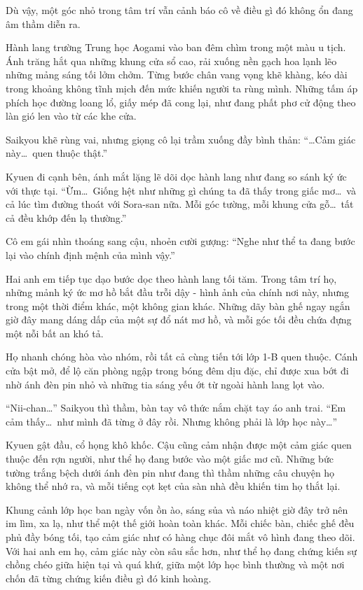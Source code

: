 \documentclass[../main.tex]{subfiles}
\begin{document}
Dù vậy, một góc nhỏ trong tâm trí vẫn cảnh báo cô về điều gì đó không ổn đang âm thầm diễn ra.

\ct

Hành lang trường Trung học Aogami vào ban đêm chìm trong một màu u tịch. Ánh trăng hắt qua những khung cửa sổ cao, rải xuống nền gạch hoa lạnh lẽo những mảng sáng tối lởm chởm. Từng bước chân vang vọng khẽ khàng, kéo dài trong khoảng không tĩnh mịch đến mức khiến người ta rùng mình. Những tấm áp phích học đường loang lổ, giấy mép đã cong lại, như đang phất phơ cử động theo làn gió len vào từ các khe cửa.

Saikyou khẽ rùng vai, nhưng giọng cô lại trầm xuống đầy bình thản: ``\dots Cảm giác này\dots\ quen thuộc thật.''

Kyuen đi cạnh bên, ánh mắt lặng lẽ dõi dọc hành lang như đang so sánh ký ức với thực tại. ``Ừm\dots\ Giống hệt như những gì chúng ta đã thấy trong giấc mơ\dots\ và cả lúc tìm đường thoát với Sora-san nữa. Mỗi góc tường, mỗi khung cửa gỗ\dots\ tất cả đều khớp đến lạ thường.''

Cô em gái nhìn thoáng sang cậu, nhoẻn cười gượng: ``Nghe như thể ta đang bước lại vào chính định mệnh của mình vậy.''

Hai anh em tiếp tục dạo bước dọc theo hành lang tối tăm. Trong tâm trí họ, những mảnh ký ức mơ hồ bắt đầu trỗi dậy - hình ảnh của chính nơi này, nhưng trong một thời điểm khác, một không gian khác. Những dãy bàn ghế ngay ngắn giờ đây mang dáng dấp của một sự đổ nát mơ hồ, và mỗi góc tối đều chứa đựng một nỗi bất an khó tả.

Họ nhanh chóng hòa vào nhóm, rồi tất cả cùng tiến tới lớp 1-B quen thuộc. Cánh cửa bật mở, để lộ căn phòng ngập trong bóng đêm dịu đặc, chỉ được xua bớt đi nhờ ánh đèn pin nhỏ và những tia sáng yếu ớt từ ngoài hành lang lọt vào.

``Nii-chan\dots'' Saikyou thì thầm, bàn tay vô thức nắm chặt tay áo anh trai. ``Em cảm thấy\dots\ như mình đã từng ở đây rồi. Nhưng không phải là lớp học này\dots''

Kyuen gật đầu, cổ họng khô khốc. Cậu cũng cảm nhận được một cảm giác quen thuộc đến rợn người, như thể họ đang bước vào một giấc mơ cũ. Những bức tường trắng bệch dưới ánh đèn pin như đang thì thầm những câu chuyện họ không thể nhớ ra, và mỗi tiếng cọt kẹt của sàn nhà đều khiến tim họ thắt lại.

Khung cảnh lớp học ban ngày vốn ồn ào, sáng sủa và náo nhiệt giờ đây trở nên im lìm, xa lạ, như thể một thế giới hoàn toàn khác. Mỗi chiếc bàn, chiếc ghế đều phủ đầy bóng tối, tạo cảm giác như có hàng chục đôi mắt vô hình đang theo dõi. Với hai anh em họ, cảm giác này còn sâu sắc hơn, như thể họ đang chứng kiến sự chồng chéo giữa hiện tại và quá khứ, giữa một lớp học bình thường và một nơi chốn đã từng chứng kiến điều gì đó kinh hoàng.
\end{document}
